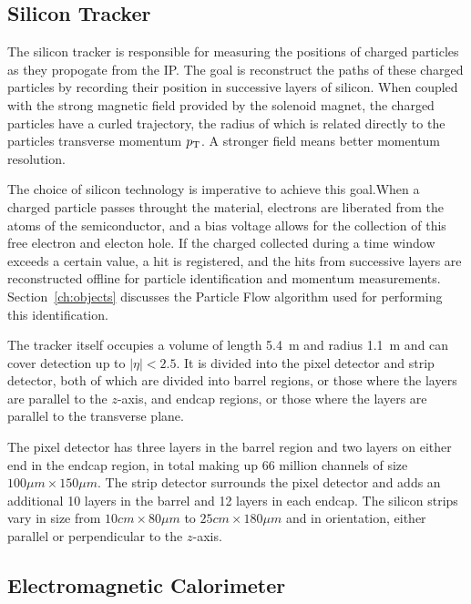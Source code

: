 \subsection{Silicon Tracker\label{subsec:tracker}}

The silicon tracker is responsible for measuring the positions of charged particles as they propogate
from the IP. The goal is reconstruct the paths of these charged particles by recording their position
in successive layers of silicon. When coupled with the strong magnetic field provided by the solenoid
magnet, the charged particles have a curled trajectory, the radius of which is related directly
to the particles transverse momentum $p_{\rm T}$. A stronger field means better momentum resolution.

The choice of silicon technology is imperative to achieve this goal.When a charged particle passes throught the material, electrons are liberated from the atoms of the semiconductor, and a bias voltage
allows for the collection of this free electron and electon hole. If the charged collected during
a time window exceeds a certain value, a hit is registered, and the hits from successive layers
are reconstructed offline for particle identification and momentum measurements.
Section~\ref{ch:objects} discusses the Particle Flow algorithm used for performing this identification.

The tracker itself occupies a volume
of length 5.4~m and radius 1.1~m and can cover detection up to $|\eta| < 2.5$. It is divided into
the pixel detector and strip detector, both of which are divided into barrel regions, or those
where the layers are parallel to the $z$-axis, and endcap regions, or those where the layers
are parallel to the transverse plane.

The pixel detector has three layers in the barrel region
and two layers on either end in the endcap region, in total making up 66 million channels of size
$100 \mu m \times 150 \mu m$. The strip detector surrounds the pixel detector and adds an additional
10 layers in the barrel and 12 layers in each endcap. The silicon strips vary in size from
$10 cm \times 80 \mu m$ to $25 cm \times 180 \mu m$ and in orientation, either parallel or perpendicular
to the $z$-axis.

\subsection{Electromagnetic Calorimeter\label{subsec:ecal}}

